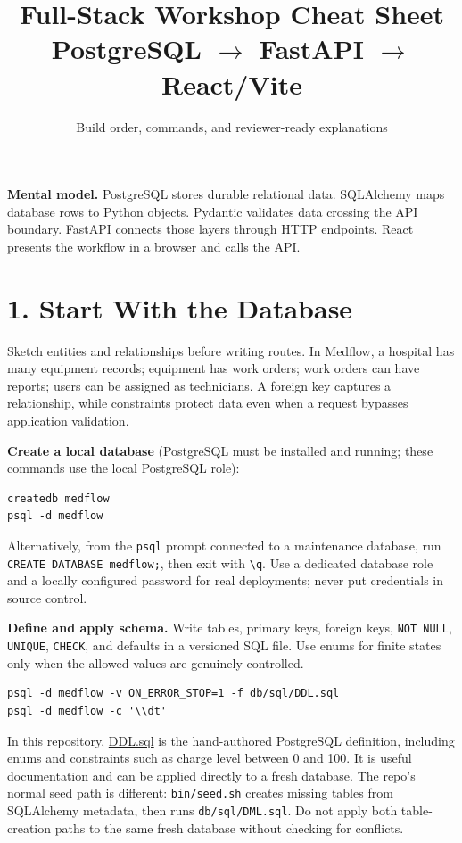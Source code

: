 \documentclass[10pt]{article}
\title{Full-Stack Workshop Cheat Sheet\\[-2pt]\large PostgreSQL $\rightarrow$ FastAPI $\rightarrow$ React/Vite}
\author{Build order, commands, and reviewer-ready explanations}
\date{}
\begin{document}
\maketitle
\vspace{-1.2em}

\textbf{Mental model.} PostgreSQL stores durable relational data. SQLAlchemy maps database rows to Python objects. Pydantic validates data crossing the API boundary. FastAPI connects those layers through HTTP endpoints. React presents the workflow in a browser and calls the API.

\section{1. Start With the Database}
Sketch entities and relationships before writing routes. In Medflow, a hospital has many equipment records; equipment has work orders; work orders can have reports; users can be assigned as technicians. A foreign key captures a relationship, while constraints protect data even when a request bypasses application validation.

\textbf{Create a local database} (PostgreSQL must be installed and running; these commands use the local PostgreSQL role):
\begin{lstlisting}
createdb medflow
psql -d medflow
\end{lstlisting}
Alternatively, from the \texttt{psql} prompt connected to a maintenance database, run \texttt{CREATE DATABASE medflow;}, then exit with \texttt{\textbackslash q}. Use a dedicated database role and a locally configured password for real deployments; never put credentials in source control.

\textbf{Define and apply schema.} Write tables, primary keys, foreign keys, \texttt{NOT NULL}, \texttt{UNIQUE}, \texttt{CHECK}, and defaults in a versioned SQL file. Use enums for finite states only when the allowed values are genuinely controlled.
\begin{lstlisting}
psql -d medflow -v ON_ERROR_STOP=1 -f db/sql/DDL.sql
psql -d medflow -c '\\dt'
\end{lstlisting}
In this repository, \href{db/sql/DDL.sql}{DDL.sql} is the hand-authored PostgreSQL definition, including enums and constraints such as charge level between 0 and 100. It is useful documentation and can be applied directly to a fresh database. The repo's normal seed path is different: \texttt{bin/seed.sh} creates missing tables from SQLAlchemy metadata, then runs \texttt{db/sql/DML.sql}. Do not apply both table-creation paths to the same fresh database without checking for conflicts.
\end{document}
